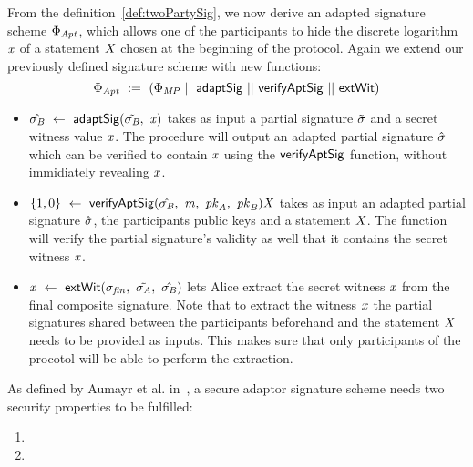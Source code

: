 
\begin{definition}
    \label{def:twoPartyFixedWitAptSig}
    From the definition~\ref{def:twoPartySig}, we now derive an adapted signature scheme $\Phi_{\mathit{Apt}}$, which allows one of the participants to hide the discrete logarithm $\mathit{x}$ of a statement $\mathit{X}$ chosen
    at the beginning of the protocol. Again we extend our previously defined signature scheme with new functions:
    \[ \Phi_{\mathit{Apt}} ~:=~ (\Phi_{\mathit{MP}} ~||~ \mathsf{adaptSig} ~||~ \mathsf{verifyAptSig} ~||~ \mathsf{extWit}) \]

    \begin{itemize}
        \item $\hat{\sigma_{\mathit{B}}} ~\leftarrow~ \mathsf{adaptSig}(\tilde{\sigma_{\mathit{B}}} ,~ \mathit{x})$ takes as input a partial signature $\tilde{\sigma}$ and a secret witness value $\mathit{x}$. The procedure will output an adapted partial signature $\hat{\sigma}$ which can be verified to contain $\mathit{x}$ using the $\mathsf{verifyAptSig}$ function, without immidiately revealing $\mathit{x}$.
        \item $\{1,0\} ~\leftarrow~ \mathsf{verifyAptSig}(\hat{\sigma_{\mathit{B}}} ,~ \mathit{m} ,~ \mathit{pk}_{\mathit{A}} ,~ \mathit{pk}_{\mathit{B}}){\mathit{X}}$ takes as input an adapted partial signature $\hat{\sigma}$, the participants public keys and a statement $\mathit{X}$. The function will verify the partial signature's validity as well that it contains the secret witness $\mathit{x}$.
        \item $\mathit{x} ~\leftarrow~ \mathsf{extWit}(\sigma_{\mathit{fin}} ,~ \tilde{\sigma_{\mathit{A}}} ,~ \hat{\sigma_{\mathit{B}}})$ lets Alice extract the secret witness $\mathit{x}$ from the final composite signature. Note that to extract the witness $\mathit{x}$ the partial signatures shared between the participants beforehand and the statement $\mathit{X}$ needs to be provided as inputs. This makes sure that only participants of the procotol will be able to perform the extraction.
    \end{itemize}
\end{definition}

\begin{definition}[\cnstSecureAptScheme]
    \label{def:aptsigsecure}
    As defined by Aumayr et al. in~\cite{aumayr2020bitcoinchannels}, a secure adaptor signature scheme needs two security properties to be fulfilled:
    \begin{enumerate}
        \item \cnstaEUFCMA
        \item \cnstWitnessExtractability
    \end{enumerate}
\end{definition}

